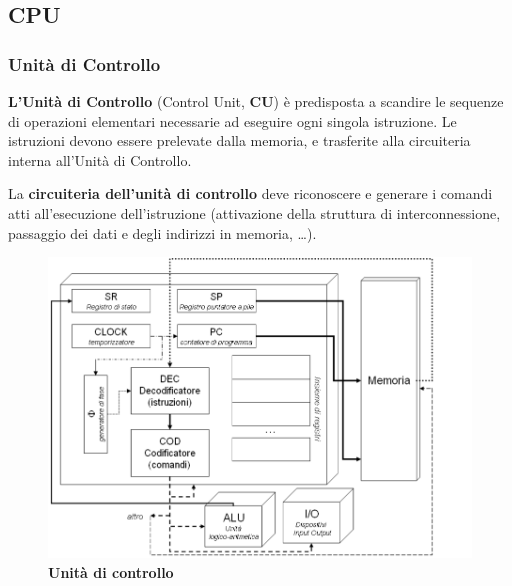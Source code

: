 \documentclass[12pt]{article}
\begin{document}
\subsection{CPU}
\subsubsection{Unità di Controllo}
\textbf{L’Unità di Controllo} (Control Unit, \textbf{CU}) è predisposta a scandire le sequenze di operazioni elementari necessarie ad eseguire ogni singola istruzione. Le istruzioni devono essere prelevate dalla memoria, e trasferite alla circuiteria interna all’Unità di Controllo.\par\medskip\noindent
La \textbf{circuiteria dell’unità di controllo} deve riconoscere e generare i comandi atti all’esecuzione dell’istruzione (attivazione della struttura di interconnessione, passaggio dei dati e degli indirizzi in memoria, …). 
\begin{figure}[h]
    \centering
    \includegraphics[width=0.75\linewidth]{image1.png}
    \caption{\textbf{Unità di controllo}}
    \label{fig:enter-label}
\end{figure}
\end{document}
